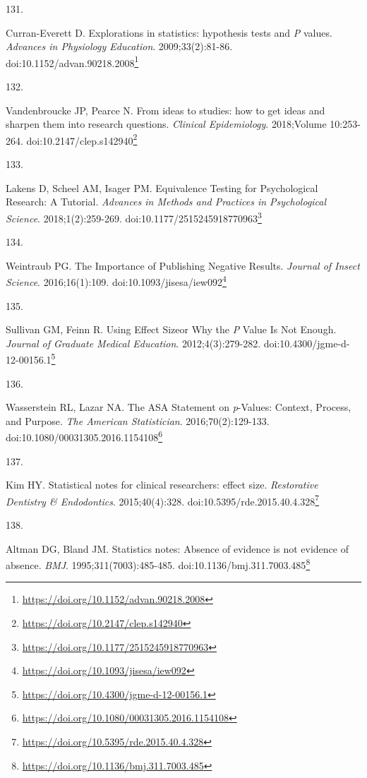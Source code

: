 \documentclass[
]{book}
\newlength{\cslhangindent}
\newlength{\csllabelwidth}
\newlength{\cslentryspacingunit} %
\newenvironment{CSLReferences}[2] %
 {%
  \setlength{\parindent}{0pt}
  \ifodd #1
  \let\oldpar\par
  \def\par{\hangindent=\cslhangindent\oldpar}
  \fi
  \setlength{\parskip}{#2\cslentryspacingunit}
 }%
 {}
\newcommand{\CSLLeftMargin}[1]{\parbox[t]{\csllabelwidth}{#1}}
\newcommand{\CSLRightInline}[1]{\parbox[t]{\linewidth - \csllabelwidth}{#1}\break}
\renewcommand{\href}[2]{#2\footnote{\url{#1}}}
\begin{document}
\begin{CSLReferences}{0}{0}
\leavevmode{}%
\CSLLeftMargin{131. }%
\CSLRightInline{Curran-Everett D. Explorations in statistics: hypothesis tests and {\emph{P}} values. \emph{Advances in Physiology Education}. 2009;33(2):81-86. doi:\href{https://doi.org/10.1152/advan.90218.2008}{10.1152/advan.90218.2008}}

\leavevmode{}%
\CSLLeftMargin{132. }%
\CSLRightInline{Vandenbroucke JP, Pearce N. From ideas to studies: how to get ideas and sharpen them into research questions. \emph{Clinical Epidemiology}. 2018;Volume 10:253-264. doi:\href{https://doi.org/10.2147/clep.s142940}{10.2147/clep.s142940}}

\leavevmode{}%
\CSLLeftMargin{133. }%
\CSLRightInline{Lakens D, Scheel AM, Isager PM. Equivalence Testing for Psychological Research: A Tutorial. \emph{Advances in Methods and Practices in Psychological Science}. 2018;1(2):259-269. doi:\href{https://doi.org/10.1177/2515245918770963}{10.1177/2515245918770963}}

\leavevmode{}%
\CSLLeftMargin{134. }%
\CSLRightInline{Weintraub PG. The Importance of Publishing Negative Results. \emph{Journal of Insect Science}. 2016;16(1):109. doi:\href{https://doi.org/10.1093/jisesa/iew092}{10.1093/jisesa/iew092}}

\leavevmode{}%
\CSLLeftMargin{135. }%
\CSLRightInline{Sullivan GM, Feinn R. Using Effect Size{\textemdash}or Why the {\emph{P}} Value Is Not Enough. \emph{Journal of Graduate Medical Education}. 2012;4(3):279-282. doi:\href{https://doi.org/10.4300/jgme-d-12-00156.1}{10.4300/jgme-d-12-00156.1}}

\leavevmode{}%
\CSLLeftMargin{136. }%
\CSLRightInline{Wasserstein RL, Lazar NA. The ASA Statement on {\emph{p}}-Values: Context, Process, and Purpose. \emph{The American Statistician}. 2016;70(2):129-133. doi:\href{https://doi.org/10.1080/00031305.2016.1154108}{10.1080/00031305.2016.1154108}}

\leavevmode{}%
\CSLLeftMargin{137. }%
\CSLRightInline{Kim HY. Statistical notes for clinical researchers: effect size. \emph{Restorative Dentistry \& Endodontics}. 2015;40(4):328. doi:\href{https://doi.org/10.5395/rde.2015.40.4.328}{10.5395/rde.2015.40.4.328}}

\leavevmode{}%
\CSLLeftMargin{138. }%
\CSLRightInline{Altman DG, Bland JM. Statistics notes: Absence of evidence is not evidence of absence. \emph{BMJ}. 1995;311(7003):485-485. doi:\href{https://doi.org/10.1136/bmj.311.7003.485}{10.1136/bmj.311.7003.485}}


\end{CSLReferences}
\end{document}
